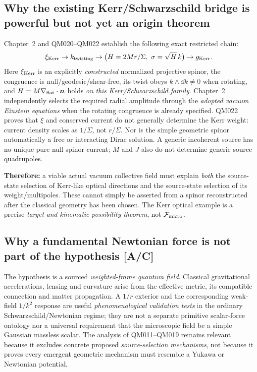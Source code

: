 \documentclass[11pt,a4paper]{article}
\begin{document}
\subsection{Why the existing Kerr/Schwarzschild bridge is powerful but not yet an origin theorem}
\label{sec:v13-optical-lesson}
Chapter~2 and QM020--QM022 establish the following exact restricted chain:
\begin{equation}\label{eq:v13-kerr-chain}
\xi_{\rm Kerr}\to k_{\rm twisting}\to
\big(H=2Mr/\Sigma,\ \sigma=\sqrt H\,k\big)
\to g_{\rm Kerr}.
\end{equation}
Here $\xi_{\rm Kerr}$ is an explicitly \emph{constructed} normalized projective spinor, the congruence is null/geodesic/shear-free, its twist obeys $k\wedge\dd k\ne0$ when rotating, and $H=M\nabla_{\rm flat}\cdot\bm n$ holds \emph{on this Kerr/Schwarzschild family}. Chapter~2 independently selects the required radial amplitude through the \emph{adopted vacuum Einstein equations} when the rotating congruence is already specified. QM022 proves that $\xi$ and conserved current do not generally determine the Kerr weight: current density scales as $1/\Sigma$, not $r/\Sigma$. Nor is the simple geometric spinor automatically a free or interacting Dirac solution. A generic incoherent source has no unique pure null spinor current; $M$ and $J$ also do not determine generic source quadrupoles.

\textbf{Therefore:} a viable actual vacuum collective field must explain \emph{both} the source-state selection of Kerr-like optical directions and the source-state selection of its weight/multipoles. These cannot simply be asserted from a spinor reconstructed after the classical geometry has been chosen. The Kerr optical example is a precise \emph{target and kinematic possibility theorem}, not $\mathcal F_{\rm micro}$.

\subsection{Why a fundamental Newtonian force is not part of the hypothesis [A/C]}
\label{sec:v13-force-distinction}
The hypothesis is a sourced \emph{weighted-frame quantum field}. Classical gravitational accelerations, lensing and curvature arise from the effective metric, its compatible connection and matter propagation. A $1/r$ exterior and the corresponding weak-field $1/k^2$ response are useful \emph{phenomenological validation tests} in the ordinary Schwarzschild/Newtonian regime; they are not a separate primitive scalar-force ontology nor a universal requirement that the microscopic field be a simple Gaussian massless scalar. The analysis of QM011--QM019 remains relevant because it excludes concrete proposed \emph{source-selection mechanisms}, not because it proves every emergent geometric mechanism must resemble a Yukawa or Newtonian potential.
\end{document}
